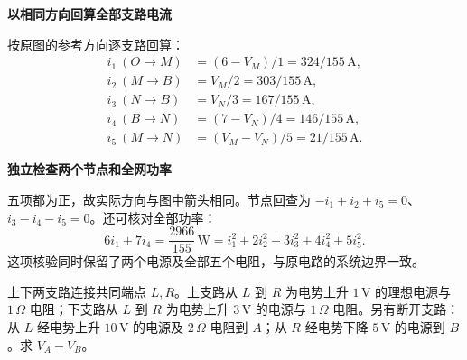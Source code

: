 \begin{solution}
\par\medskip{}\noindent\textbf{以相同方向回算全部支路电流}\par\nobreak
按原图的参考方向逐支路回算：
\begin{align*}
 i_1\ (O\to M)&=(6-V_M)/1=324/155\,\mathrm A,\\
 i_2\ (M\to B)&=V_M/2=303/155\,\mathrm A,\\
 i_3\ (N\to B)&=V_N/3=167/155\,\mathrm A,\\
 i_4\ (B\to N)&=(7-V_N)/4=146/155\,\mathrm A,\\
 i_5\ (M\to N)&=(V_M-V_N)/5=21/155\,\mathrm A.
\end{align*}


\par\medskip{}\noindent\textbf{独立检查两个节点和全网功率}\par\nobreak
五项都为正，故实际方向与图中箭头相同。节点回查为 $-i_1+i_2+i_5=0$、$i_3-i_4-i_5=0$。还可核对全部功率：
\[
 6i_1+7i_4=\frac{2966}{155}\,\mathrm W
 =i_1^2+2i_2^2+3i_3^2+4i_4^2+5i_5^2.
\]
这项核验同时保留了两个电源及全部五个电阻，与原电路的系统边界一致。
\end{solution}
\begin{question}\begin{example}[断口两侧的电势差]\label{c2:example:4}
上下两支路连接共同端点 $L,R$。上支路从 $L$ 到 $R$ 为电势上升 $1\,\mathrm V$ 的理想电源与 $1\,\Omega$ 电阻；下支路从 $L$ 到 $R$ 为电势上升 $3\,\mathrm V$ 的电源与 $1\,\Omega$ 电阻。另有断开支路：从 $L$ 经电势上升 $10\,\mathrm V$ 的电源及 $2\,\Omega$ 电阻到 $A$；从 $R$ 经电势下降 $5\,\mathrm V$ 的电源到 $B$。求 $V_A-V_B$。
\end{example}
\end{question}
